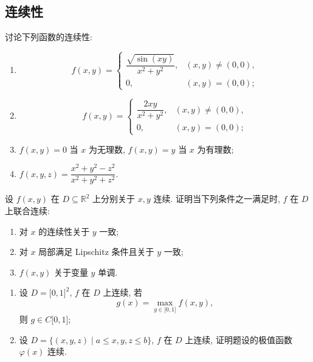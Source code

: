 \documentclass[../../数学分析培优讲义.tex]{subfiles}
\begin{document}
\subsection{连续性}

\begin{example}
讨论下列函数的连续性:
\begin{enumerate}[label=(\arabic*)]
    \item
    \[
        f(x,y)=
        \begin{cases}
            \dfrac{\sqrt{\sin(xy)}}{x^2+y^2}, & (x,y)\ne(0,0),\\
            0, & (x,y)=(0,0);
        \end{cases}
    \]
    \item
    \[
        f(x,y)=
        \begin{cases}
            \dfrac{2xy}{x^2+y^2}, & (x,y)\ne(0,0),\\
            0, & (x,y)=(0,0);
        \end{cases}
    \]
    \item $f(x,y)=0$ 当 $x$ 为无理数, $f(x,y)=y$ 当 $x$ 为有理数;
    \item $\displaystyle f(x,y,z)=\dfrac{x^2+y^2-z^2}{x^2+y^2+z^2}$.
\end{enumerate}
\end{example}
\exampleblank

\begin{example}[\markstar]
设 $f(x,y)$ 在 $D\subseteq\mathbb{R}^2$ 上分别关于 $x,y$ 连续. 证明当下列条件之一满足时, $f$ 在 $D$ 上联合连续:
\begin{enumerate}[label=(\arabic*)]
    \item 对 $x$ 的连续性关于 $y$ 一致;
    \item 对 $x$ 局部满足 Lipschitz 条件且关于 $y$ 一致;
    \item $f(x,y)$ 关于变量 $y$ 单调.
\end{enumerate}
\end{example}
\exampleblank

\begin{example}[\markstar]
\begin{enumerate}[label=(\arabic*)]
    \item 设 $D=\lbrack0,1\rbrack^2$, $f$ 在 $D$ 上连续, 若
    \[
        g(x)=\max_{y\in\lbrack0,1\rbrack}f(x,y),
    \]
    则 $g\in C\lbrack0,1\rbrack$;
    \item 设 $D=\{(x,y,z)\mid a\leq x,y,z\leq b\}$, $f$ 在 $D$ 上连续, 证明题设的极值函数 $\varphi(x)$ 连续.
\end{enumerate}
\end{example}
\exampleblank
\end{document}
